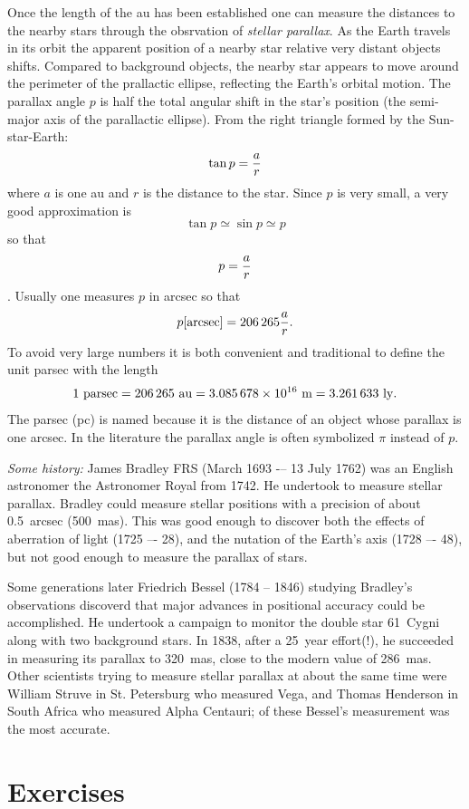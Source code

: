 Once the length of the au has been established one can measure the distances to the nearby stars
through the obsrvation of {\it stellar parallax}. As the Earth travels in its orbit the apparent
position of a nearby star relative very distant objects shifts. Compared to background objects,
the nearby star appears to move around the perimeter of the prallactic ellipse, reflecting the 
Earth's orbital motion. The parallax angle $p$ is half the total angular shift in the star's
position (the semi-major axis of the parallactic ellipse). From the right triangle formed by the
Sun-star-Earth:
\[ \tan p={a\over r} \]
where $a$ is one au and $r$ is the distance to the star. Since $p$ is very small, a very good 
approximation is \[\tan p\simeq\sin p\simeq p\] so that \[ p={a\over r}\]. Usually one measures
$p$ in arcsec so that 
\[ p[{\rm arcsec}]=206\,265{a\over r}. \]
To avoid very large numbers it is both convenient and traditional to define the unit parsec with 
the length
\[ 1~{\rm parsec}=206\,265~{\rm au}=3.085\,678\times 10^{16}~{\rm m}=3.261\,633~{\rm ly}. \]
The parsec (pc) is named because it is the distance of an object whose parallax is one arcsec. 
In the literature the parallax angle is often symbolized $\pi$ instead of $p$.

{\it Some history:} James Bradley FRS (March 1693 -– 13 July 1762) was an English astronomer the Astronomer Royal from 1742. He undertook to measure stellar parallax. Bradley could measure stellar positions with a precision of about 0.5~arcsec (500~mas). This was good enough to
discover both the effects of aberration of light (1725 –- 28), and the nutation of the Earth's axis (1728 –- 48), but not good enough to measure the parallax of stars.

Some generations later Friedrich Bessel (1784 -- 1846) studying Bradley's observations discoverd
that major advances in positional accuracy could be accomplished. He undertook a campaign to
monitor the double star 61~Cygni along with two background stars. In 1838, after a 25~year effort(!), he succeeded in measuring its parallax to 320~mas, close to the modern value of 
286~mas. Other scientists trying to measure stellar parallax at about the same time were
William Struve in St. Petersburg who measured Vega, and Thomas Henderson in South Africa who measured Alpha Centauri; of these Bessel's measurement was the most accurate.

\section{Exercises}

